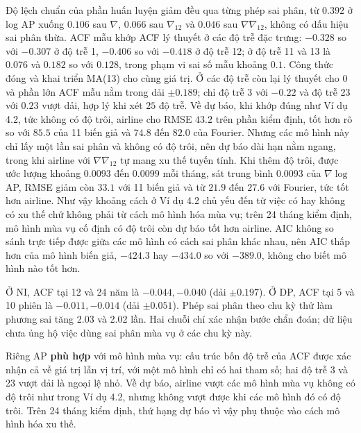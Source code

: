 
 Độ lệch chuẩn của phần huấn luyện giảm đều qua từng phép sai phân, từ $0.392$ ở log AP xuống $0.106$ sau $\nabla$, $0.066$ sau $\nabla_{12}$ và $0.046$ sau $\nabla\nabla_{12}$, không có dấu hiệu sai phân thừa. ACF mẫu khớp ACF lý thuyết ở các độ trễ đặc trưng: $-0.328$ so với $-0.307$ ở độ trễ 1, $-0.406$ so với $-0.418$ ở độ trễ 12; ở độ trễ 11 và 13 là $0.076$ và $0.182$ so với $0.128$, trong phạm vi sai số mẫu khoảng $0.1$. Công thức đóng và khai triển MA(13) cho cùng giá trị. Ở các độ trễ còn lại lý thuyết cho $0$ và phần lớn ACF mẫu nằm trong dải $\pm0.189$; chỉ độ trễ 3 với $-0.22$ và độ trễ 23 với $0.23$ vượt dải, hợp lý khi xét $25$ độ trễ. Về dự báo, khi khớp đúng như Ví dụ 4.2, tức không có độ trôi, airline cho RMSE $43.2$ trên phần kiểm định, tốt hơn rõ so với $85.5$ của 11 biến giả và $74.8$ đến $82.0$ của Fourier. Nhưng các mô hình này chỉ lấy một lần sai phân và không có độ trôi, nên dự báo dài hạn nằm ngang, trong khi airline với $\nabla\nabla_{12}$ tự mang xu thế tuyến tính. Khi thêm độ trôi, được ước lượng khoảng $0.0093$ đến $0.0099$ mỗi tháng, sát trung bình $0.0093$ của $\nabla\log$ AP, RMSE giảm còn $33.1$ với 11 biến giả và từ $21.9$ đến $27.6$ với Fourier, tức tốt hơn airline. Như vậy khoảng cách ở Ví dụ 4.2 chủ yếu đến từ việc có hay không có xu thế chứ không phải từ cách mô hình hóa mùa vụ; trên 24 tháng kiểm định, mô hình mùa vụ cố định có độ trôi còn dự báo tốt hơn airline. AIC không so sánh trực tiếp được giữa các mô hình có cách sai phân khác nhau, nên AIC thấp hơn của mô hình biến giả, $-424.3$ hay $-434.0$ so với $-389.0$, không cho biết mô hình nào tốt hơn.

Ở NI, ACF tại 12 và 24 năm là $-0.044,-0.040$ (dải $\pm0.197$). Ở DP, ACF tại 5 và 10 phiên là $-0.011,-0.014$ (dải $\pm0.051$). Phép sai phân theo chu kỳ thử làm phương sai tăng 2.03 và 2.02 lần. Hai chuỗi chỉ xác nhận bước chẩn đoán; dữ liệu chưa ủng hộ việc dùng sai phân mùa vụ ở các chu kỳ này.

 Riêng AP \textbf{phù hợp} với mô hình mùa vụ: cấu trúc bốn độ trễ của ACF được xác nhận cả về giá trị lẫn vị trí, với một mô hình chỉ có hai tham số; hai độ trễ 3 và 23 vượt dải là ngoại lệ nhỏ. Về dự báo, airline vượt các mô hình mùa vụ không có độ trôi như trong Ví dụ 4.2, nhưng không vượt được khi các mô hình đó có độ trôi. Trên 24 tháng kiểm định, thứ hạng dự báo vì vậy phụ thuộc vào cách mô hình hóa xu thế.

